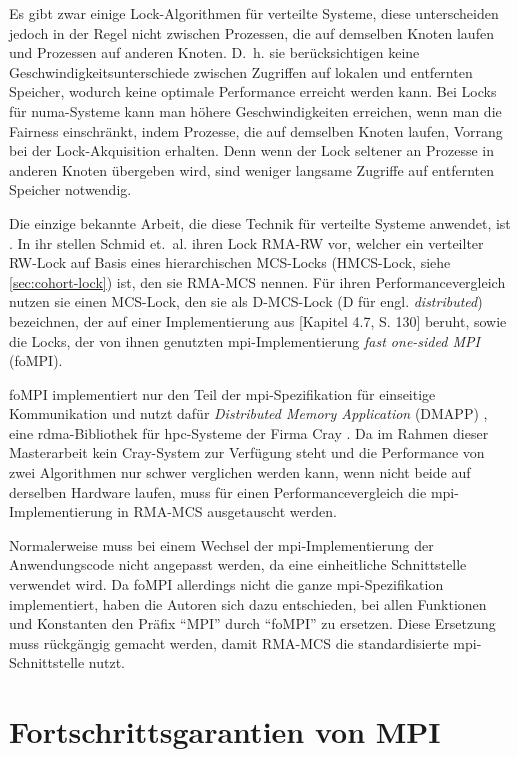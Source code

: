 Es gibt zwar einige Lock-Algorithmen für verteilte Systeme,
diese unterscheiden jedoch in der Regel nicht zwischen Prozessen,
die auf demselben Knoten laufen und Prozessen auf anderen Knoten.
D.~h. sie berücksichtigen keine Geschwindigkeitsunterschiede zwischen Zugriffen auf lokalen und entfernten Speicher,
wodurch keine optimale Performance erreicht werden kann.
Bei Locks für \gls{numa}-Systeme
kann man höhere Geschwindigkeiten erreichen,
wenn man die Fairness einschränkt,
indem Prozesse,
die auf demselben Knoten laufen,
Vorrang bei der Lock-Akquisition erhalten.
Denn wenn der Lock seltener an Prozesse in anderen Knoten übergeben wird,
sind weniger langsame Zugriffe auf entfernten Speicher notwendig.

Die einzige bekannte Arbeit,
die diese Technik für verteilte Systeme anwendet,
ist \cite{RMA-RW}.
In ihr stellen Schmid et.~al. ihren Lock RMA-RW vor,
welcher ein verteilter RW-Lock auf Basis eines hierarchischen MCS-Locks
(HMCS-Lock, siehe \autoref{sec:cohort-lock})
ist,
den sie RMA-MCS nennen.
Für ihren Performancevergleich nutzen sie einen MCS-Lock,
den sie als D-MCS-Lock (D für engl. \textit{distributed}) bezeichnen,
der auf einer Implementierung aus \cite{AdvancedMpi}[Kapitel 4.7, S. 130] beruht,
sowie die Locks,
der von ihnen genutzten \gls{mpi}-Implementierung \textit{fast one-sided MPI} (foMPI).

foMPI implementiert nur den Teil der \gls{mpi}-Spezifikation für einseitige Kommunikation
und nutzt dafür \textit{Distributed Memory Application} (DMAPP) \cite{dmapp},
eine \gls{rdma}-Bibliothek für \gls{hpc}-Systeme der Firma Cray \cite{foMPI}.
Da im Rahmen dieser Masterarbeit kein Cray-System zur Verfügung steht
und die Performance von zwei Algorithmen nur schwer verglichen werden kann,
wenn nicht beide auf derselben Hardware laufen,
muss für einen Performancevergleich die \gls{mpi}-Implementierung in RMA-MCS ausgetauscht werden.

Normalerweise muss bei einem Wechsel der \gls{mpi}-Implementierung der Anwendungscode nicht angepasst werden,
da eine einheitliche Schnittstelle verwendet wird.
Da foMPI allerdings nicht die ganze \gls{mpi}-Spezifikation implementiert,
haben die Autoren sich dazu entschieden,
bei allen Funktionen und Konstanten den Präfix \enquote{MPI} durch \enquote{foMPI} zu ersetzen.
Diese Ersetzung muss rückgängig gemacht werden,
damit RMA-MCS die standardisierte \gls{mpi}-Schnittstelle nutzt.

\section{Fortschrittsgarantien von MPI}
\label{sec:mpi_fortschritt}

